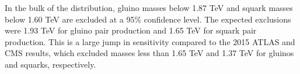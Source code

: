 In the bulk of the distribution, gluino masses below 1.87 TeV and squark masses below 
1.60 TeV are excluded at a 95\% confidence level. The expected exclusions were
1.93 TeV for gluino pair production and 1.65 TeV for squark pair production. 
This is a large jump in sensitivity compared to the 2015 ATLAS and CMS results, which excluded 
masses less than 1.65 TeV and 1.37 TeV for gluinos and squarks, respectively. 


